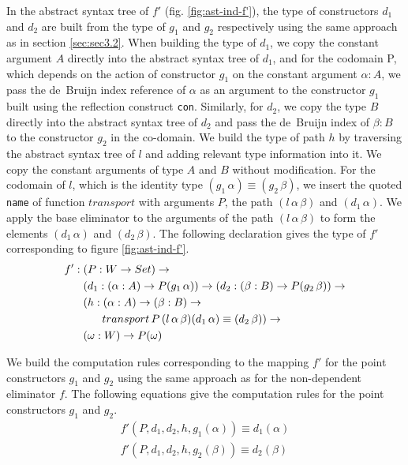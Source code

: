 \documentclass[sigplan,10pt]{acmart}
\begin{document}
In the abstract syntax tree of $f'$ (fig. \ref{fig:ast-ind-f'}), the type of constructors $d_1$ and $d_2$ are built from the type of $g_1$ and $g_2$ respectively using the same approach as in section \eqref{sec:sec3.2}. When building the type of $d_1$, we copy the constant argument $A$ directly into the abstract syntax tree of $d_1$, and for the codomain P, which depends on the action of constructor $g_1$ on the constant argument $\alpha : A$, we pass the de~Bruijn index reference of $\alpha$ as an argument to the constructor $g_1$ built using the reflection construct {\tt con}. Similarly, for $d_2$, we copy the type $B$ directly into the abstract syntax tree of $d_2$ and pass the de~Bruijn index of $\beta : B$ to the constructor $g_2$ in the co-domain. We build the type of path $h$ by traversing the abstract syntax tree of $l$ and adding relevant type information into it. We copy the constant arguments of type $A$ and $B$ without modification. For the codomain of $l$, which is the identity type $(g_1 \, \alpha) \equiv (g_2 \, \beta)$, we insert the quoted {\tt name} of function $transport$ with arguments $P$, the path $(l \, \alpha \, \beta)$ and $(d_1 \, \alpha)$. We apply the base eliminator to the arguments of the path $(l \, \alpha \, \beta)$ to form the elements $(d_1 \, \alpha)$ and $(d_2 \, \beta)$. The following declaration gives the type of $f'$ corresponding to figure \eqref{fig:ast-ind-f'}. 
\begin{align}
& f' : (P : W \rightarrow Set) \rightarrow \nonumber \\
& \hspace {0.6cm} (d_1 : (\alpha : A) \rightarrow P (g_1 \, \alpha)) \rightarrow (d_2 : (\beta : B) \rightarrow P (g_2 \, \beta)) \rightarrow \nonumber \\ 
& \hspace {0.6cm} (h : (\alpha : A) \rightarrow (\beta : B) \rightarrow \nonumber \\
& \hspace {1.2cm} transport \, P \, (l \, \alpha \, \beta) (d_1 \, \alpha) \equiv (d_2 \, \beta)) \rightarrow \nonumber \\
& \hspace {0.6cm} (\omega : W) \rightarrow P (\omega) \nonumber
\end{align}

We build the computation rules corresponding to the mapping $f'$ for the point constructors $g_1$ and $g_2$ using the same approach as for the non-dependent eliminator $f$. The following equations give the computation rules for the point constructors $g_1$ and $g_2$.
\begin{align}
f' (P, d_1, d_2, h, g_1 (\alpha)) \equiv d_1 (\alpha) \nonumber \\
f' (P, d_1, d_2, h, g_2 (\beta)) \equiv d_2 (\beta) \nonumber
\end{align}
\end{document}
